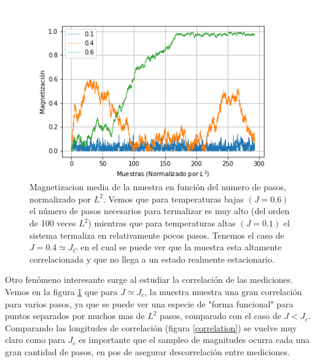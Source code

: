 \documentclass[%
 reprint,
 amsmath,amssymb,
 aps,
]{revtex4-1}
\begin{document}
\begin{figure}
  \includegraphics[width=1.0\columnwidth]{images/termalizacion.png}
  \caption{Magnetizacion media de la muestra en funci\'on del numero de pasos,
    normalizado por $L^2$. Vemos que para temperaturas bajas $(J = 0.6)$ el
    n\'umero de pasos necesarios para termalizar es muy alto (del orden de 100
    veces $L^2$) mientras que para temperaturas altas $(J = 0.1)$ el sistema
    termaliza en relativamente pocos pasos. Tenemos el caso de $J = 0.4
    \simeq J_C$ en el cual se puede ver que la muestra esta altamente
    correlacionada y que no llega a un estado realmente estacionario.}
  \label{termalizacion}
\end{figure}

Otro fen\'omeno interesante surge al estudiar la correlaci\'on de las
mediciones. Vemos en la figura \ref{termalizacion} que para $J \simeq J_c$, la
muestra muestra una gran correlaci\'on para varios pasos, ya que se puede ver
una especie de "forma funcional" para puntos separados por muchos mas de $L^2$
pasos, comparado con el caso de $J < J_c$. Comparando las longitudes de
correlaci\'on (figura \ref{correlation}) se vuelve muy claro como para $J_c$
es importante que el sampleo de magnitudes ocurra cada una gran cantidad de
pasos, en pos de asegurar descorrelaci\'on entre mediciones.
\end{document}
